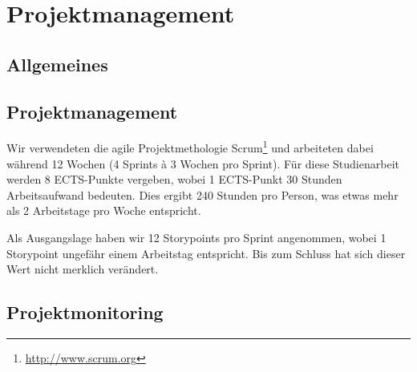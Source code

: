\chapter{Projektmanagement}

\section{Allgemeines}

\section{Projektmanagement}
Wir verwendeten die agile Projektmethologie Scrum\footnote{\url{http://www.scrum.org}} und arbeiteten dabei während 12 Wochen (4 Sprints à 3 Wochen pro Sprint).
Für diese Studienarbeit werden 8 ECTS-Punkte vergeben, wobei 1 ECTS-Punkt 30 Stunden Arbeitsaufwand bedeuten.
Dies ergibt 240 Stunden pro Person, was etwas mehr als 2 Arbeitstage pro Woche entspricht.

Als Ausgangslage haben wir 12 Storypoints pro Sprint angenommen, wobei 1 Storypoint ungefähr einem Arbeitstag entspricht. Bis zum Schluss hat sich dieser Wert nicht merklich verändert.









\section{Projektmonitoring}
